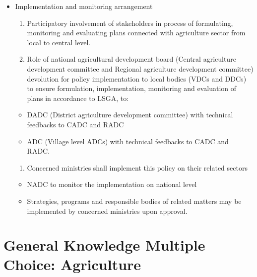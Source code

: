 \documentclass[
  openany]{book}
\providecommand{\tightlist}{%
  \setlength{\itemsep}{0pt}\setlength{\parskip}{0pt}}
\begin{document}
\begin{itemize}
\tightlist
\item
  Implementation and monitoring arrangement

  \begin{enumerate}
  \def\labelenumi{\arabic{enumi}.}
  \tightlist
  \item
    Participatory involvement of stakeholders in process of formulating, monitoring and evaluating plans connected with agriculture sector from local to central level.
  \item
    Role of national agricultural development board (Central agriculture development committee and Regional agriculture development committee) devolution for policy implementation to local bodies (VDCs and DDCs) to ensure formulation, implementation, monitoring and evaluation of plans in accordance to LSGA, to:
  \end{enumerate}

  \begin{itemize}
  \tightlist
  \item
    DADC (District agriculture development committee) with technical feedbacks to CADC and RADC
  \item
    ADC (Village level ADCs) with technical feedbacks to CADC and RADC.
  \end{itemize}

  \begin{enumerate}
  \def\labelenumi{\arabic{enumi}.}
  \setcounter{enumi}{2}
  \tightlist
  \item
    Concerned ministries shall implement this policy on their related sectors
  \end{enumerate}

  \begin{itemize}
  \tightlist
  \item
    NADC to monitor the implementation on national level
  \item
    Strategies, programs and responsible bodies of related matters may be implemented by concerned ministries upon approval.
  \end{itemize}
\end{itemize}

\hypertarget{general-knowledge-multiple-choice-agriculture}{%
\chapter{General Knowledge Multiple Choice: Agriculture}\label{general-knowledge-multiple-choice-agriculture}}



  
\end{document}
